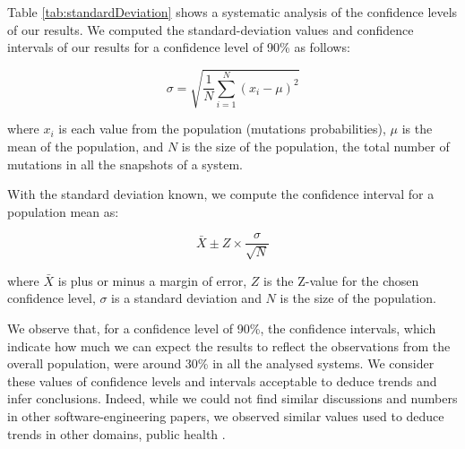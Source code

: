 Table \ref{tab:standardDeviation} shows a systematic analysis of the confidence levels of our results. We computed the standard-deviation values and confidence intervals of our results for a confidence level of 90\% as follows:

\begin{equation}
    \sigma = \sqrt{\frac{1}{N}\sum_{i=1}^{N}{ (x_i-\mu)}^2}
\end{equation}

\noindent where $x_i$ is each value from the population (mutations probabilities), $\mu$ is the mean of the population, and $N$ is the size of the population, \ie{} the total number of mutations in all the snapshots of a system.

With the standard deviation known, we compute the confidence interval for a population mean as:

\begin{equation}
    \bar{X}\pm Z \times {\frac{\sigma}{\sqrt{N}}}
\end{equation}

\noindent where $\bar{X}$ is plus or minus a margin of error, $Z$ is the Z-value for the chosen confidence level, $\sigma$ is a standard deviation and $N$ is the size of the population.

We observe that, for a confidence level of 90\%, the confidence intervals, which indicate how much we can expect the results to reflect the observations from the overall population, were around 30\% in all the analysed systems. We consider these values of confidence levels and intervals acceptable to deduce trends and infer conclusions. Indeed, while we could not find similar discussions and numbers in other software-engineering papers, we observed similar values used to deduce trends in other domains, \eg{} public health \cite{strazzullo2009salt}.

\begin{table*} %
\centering
\caption{Mean values of the mutations of design anti-patterns and design pattern occurrences mutated in all the snapshots of each system}
\label{tab:MeanValue}
\end{table*} 

